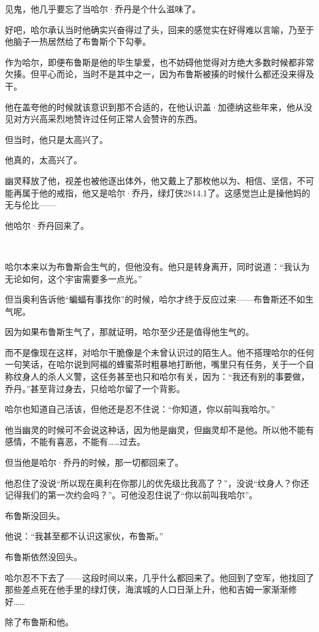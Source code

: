 \documentclass[../main]{subfiles}
\begin{document}
见鬼，他几乎要忘了当哈尔·乔丹是个什么滋味了。

好吧，哈尔承认当时他确实兴奋得过了头，回来的感觉实在好得难以言喻，乃至于他脑子一热居然给了布鲁斯个下勾拳。

作为哈尔，即便布鲁斯是他的毕生挚爱，也不妨碍他觉得对方绝大多数时候都非常欠揍。但平心而论，当时不是其中之一，因为布鲁斯被揍的时候什么都还没来得及干。

他在盖夸他的时候就该意识到那不合适的，在他认识盖·加德纳这些年来，他从没见对方兴高采烈地赞许过任何正常人会赞许的东西。

但当时，他只是太高兴了。

他真的，太高兴了。

幽灵释放了他，视差也被他逐出体外，他又戴上了那枚他以为、相信、坚信，不可能再属于他的戒指，他又是哈尔·乔丹，绿灯侠2814.1了。这感觉岂止是操他妈的无与伦比——

他哈尔·乔丹回来了。

~\

哈尔本来以为布鲁斯会生气的，但他没有。他只是转身离开，同时说道：“我认为无论如何，这个宇宙需要多一点光。”

但当奥利告诉他“蝙蝠有事找你”的时候，哈尔才终于反应过来——布鲁斯还不如生气呢。

因为如果布鲁斯生气了，那就证明，哈尔至少还是值得他生气的。

而不是像现在这样，对哈尔干脆像是个未曾认识过的陌生人。他不搭理哈尔的任何一句笑话，在哈尔说到阿福的蜂蜜茶时粗暴地打断他，嘴里只有任务，关于一个自称纹身人的杀人义警，这任务甚至也只和哈尔有关，因为：“我还有别的事要做，乔丹。”甚至背过身去，只给哈尔留了一个背影。

哈尔也知道自己活该，但他还是忍不住说：“你知道，你以前叫我哈尔。”

他当幽灵的时候可不会说这种话，因为他是幽灵，但幽灵却不是他。所以他不能有感情，不能有喜恶，不能有……过去。

但当他是哈尔·乔丹的时候，那一切都回来了。

他忍住了没说“所以现在奥利在你那儿的优先级比我高了？”，没说“纹身人？你还记得我们的第一次约会吗？”。可他没忍住说了“你以前叫我哈尔”。

布鲁斯没回头。

他说：“我甚至都不认识这家伙，布鲁斯。”

布鲁斯依然没回头。

哈尔忍不下去了——这段时间以来，几乎什么都回来了。他回到了空军，他找回了那些差点死在他手里的绿灯侠，海滨城的人口日渐上升，他和吉姆一家渐渐修好……

除了布鲁斯和他。
\end{document}
